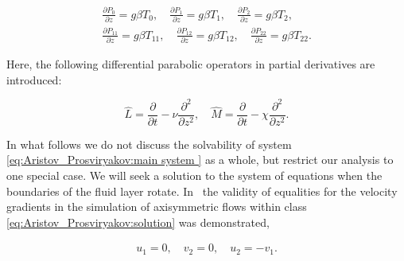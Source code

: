 \begin{gather}
\frac{\partial P_0}{\partial z}=g\beta T_0,

\quad 

\frac{\partial P_1}{\partial z}=g\beta T_1,

\quad 

\frac{\partial P_2}{\partial z}=g\beta T_2,

\\

\frac{\partial P_{11}}{\partial z}=g\beta T_{11},

\quad 

\frac{\partial P_{12}}{\partial z}=g\beta T_{12},

\quad 

\frac{\partial P_{22}}{\partial z}=g\beta T_{22}.

 \end{gather}

Here, the following differential parabolic operators in partial derivatives are intro\-duced:

$$\hat{L}=\frac{\partial }{\partial t}-\nu\frac{\partial^2 }{\partial z^2},\quad 

\hat{M}=\frac{\partial }{\partial t}-\chi\frac{\partial^2 }{\partial z^2}. 

$$





\smallskip






In what follows we do not discuss the solvability of system \eqref{eq:Aristov_Prosviryakov:main system } as a whole, but restrict our analysis to one special case. We will seek a solution to the system of equations when the boundaries of the fluid layer rotate. In~\cite{ulg:bib:Aristov2} the validity of equalities for the velocity gradients in the simulation of axisymmetric flows within class \eqref{eq:Aristov_Prosviryakov:solution} was demonstrated,

\begin{gather}

       \label{eq:Aristov_Prosviryakov:sol1}

u_1=0,

\quad 

v_2=0,       

\quad 

u_2=-v_1.       

 \end{gather}

